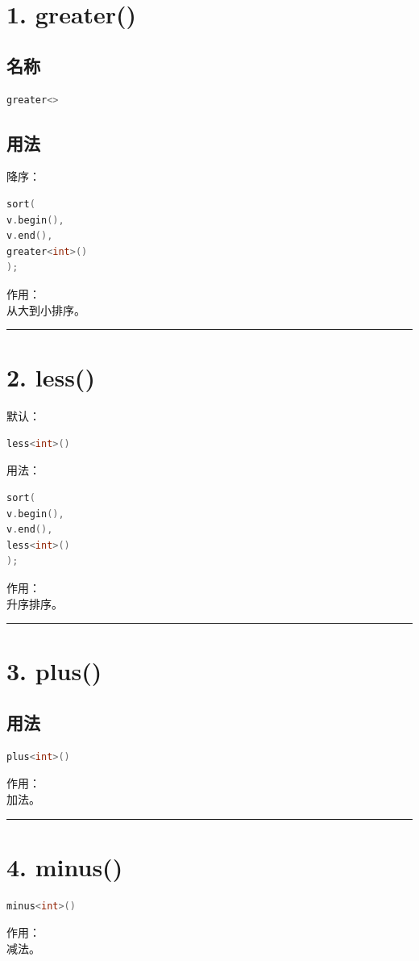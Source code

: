 \documentclass[10pt,twocolumn]{extarticle}
\begin{document}
\section{1. greater()}

\subsection{名称}
\begin{lstlisting}[language=C++]
greater<>
\end{lstlisting}

\subsection{用法}
降序：
\begin{lstlisting}[language=C++]
sort(
v.begin(),
v.end(),
greater<int>()
);
\end{lstlisting}
作用：\\
从大到小排序。

\noindent\rule{\linewidth}{0.4pt}

\section{2. less()}

默认：
\begin{lstlisting}[language=C++]
less<int>()
\end{lstlisting}
用法：
\begin{lstlisting}[language=C++]
sort(
v.begin(),
v.end(),
less<int>()
);
\end{lstlisting}
作用：\\
升序排序。

\noindent\rule{\linewidth}{0.4pt}

\section{3. plus()}

\subsection{用法}
\begin{lstlisting}[language=C++]
plus<int>()
\end{lstlisting}
作用：\\
加法。

\noindent\rule{\linewidth}{0.4pt}

\section{4. minus()}
\begin{lstlisting}[language=C++]
minus<int>()
\end{lstlisting}
作用：\\
减法。
\end{document}
